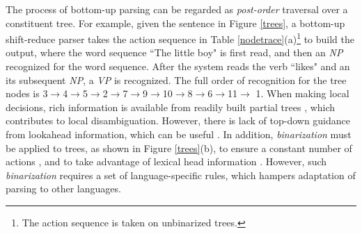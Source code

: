 \documentclass[11pt,letterpaper]{article}
\begin{document}
The process of bottom-up parsing can be regarded as \textit{post-order} traversal over a constituent tree.
For example, given the sentence in Figure \ref{trees}, a bottom-up shift-reduce parser takes the action sequence in Table \ref{nodetrace}(a)\footnote{The action sequence is taken on unbinarized trees.} to build the output, where the word sequence ``The little boy" is first read, and then an \textit{NP} recognized for the word sequence.
After the system reads the verb ``likes" and an its subsequent \textit{NP}, a \textit{VP} is recognized.
The full order of recognition for the tree nodes is \textcircled{\scriptsize{3}}$\rightarrow$\textcircled{\scriptsize{4}}$\rightarrow$\textcircled{\scriptsize{5}}$\rightarrow$\textcircled{\scriptsize{2}}$\rightarrow$\textcircled{\scriptsize{7}}$\rightarrow$\textcircled{\scriptsize{9}}$\rightarrow$\textcircled{\scriptsize{10}}$\rightarrow$\textcircled{\scriptsize{8}}$\rightarrow$\textcircled{\scriptsize{6}}$\rightarrow$\textcircled{\scriptsize{11}}$\rightarrow$ \textcircled{\scriptsize{1}}.
When making local decisions, rich information is available from readily built partial trees \cite{zhu:2013,watanabe:2015,cross:2016}, which contributes to local disambiguation.
However, there is lack of top-down guidance from lookahead information, which can be useful \cite{johnson:1998,roark:1999,charniak:2000,liu:2017}.
In addition, \textit{binarization} must be applied to trees, as shown in Figure \ref{trees}(b), to ensure a constant number of actions \cite{sagae:2005}, and to take advantage of lexical head information \cite{collins:2003}.
However, such \textit{binarization} requires a set of language-specific rules, which hampers adaptation of parsing to other languages.
\end{document}
